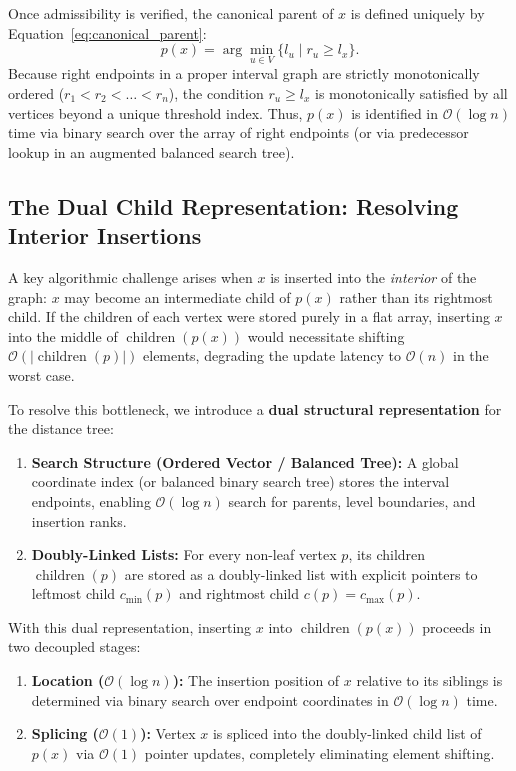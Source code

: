 Once admissibility is verified, the canonical parent of $x$ is defined uniquely by Equation~\eqref{eq:canonical_parent}:
\begin{equation}
    p(x) = \arg\min_{u \in V} \{ l_u \mid r_u \ge l_x \}.
\end{equation}
Because right endpoints in a proper interval graph are strictly monotonically ordered ($r_1 < r_2 < \dots < r_n$), the condition $r_u \ge l_x$ is monotonically satisfied by all vertices beyond a unique threshold index. Thus, $p(x)$ is identified in $\mathcal{O}(\log n)$ time via binary search over the array of right endpoints (or via predecessor lookup in an augmented balanced search tree).

\subsection{The Dual Child Representation: Resolving Interior Insertions}
\label{sec:dual_child_representation}

A key algorithmic challenge arises when $x$ is inserted into the \emph{interior} of the graph: $x$ may become an intermediate child of $p(x)$ rather than its rightmost child. If the children of each vertex were stored purely in a flat array, inserting $x$ into the middle of $\operatorname{children}(p(x))$ would necessitate shifting $\mathcal{O}(|\operatorname{children}(p)|)$ elements, degrading the update latency to $\mathcal{O}(n)$ in the worst case.

To resolve this bottleneck, we introduce a \textbf{dual structural representation} for the distance tree:
\begin{enumerate}
    \item \textbf{Search Structure (Ordered Vector / Balanced Tree):} A global coordinate index (or balanced binary search tree) stores the interval endpoints, enabling $\mathcal{O}(\log n)$ search for parents, level boundaries, and insertion ranks.
    \item \textbf{Doubly-Linked Lists:} For every non-leaf vertex $p$, its children $\operatorname{children}(p)$ are stored as a doubly-linked list with explicit pointers to leftmost child $c_{\min}(p)$ and rightmost child $c(p) = c_{\max}(p)$.
\end{enumerate}

With this dual representation, inserting $x$ into $\operatorname{children}(p(x))$ proceeds in two decoupled stages:
\begin{enumerate}
    \item \textbf{Location ($\mathcal{O}(\log n)$):} The insertion position of $x$ relative to its siblings is determined via binary search over endpoint coordinates in $\mathcal{O}(\log n)$ time.
    \item \textbf{Splicing ($\mathcal{O}(1)$):} Vertex $x$ is spliced into the doubly-linked child list of $p(x)$ via $\mathcal{O}(1)$ pointer updates, completely eliminating element shifting.
\end{enumerate}

